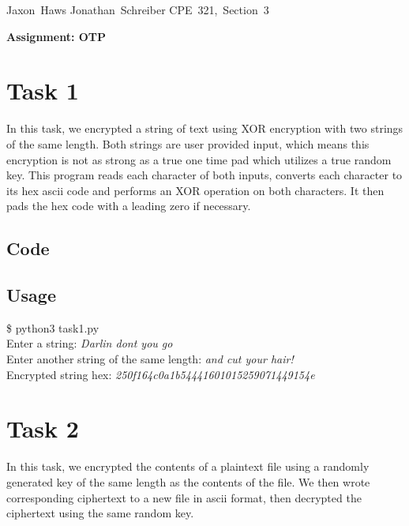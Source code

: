 \documentclass[11pt]{article}
\begin{document}
\hfill\vbox{\hbox{Jaxon Haws}
		\hbox{Jonathan Schreiber}	
		\hbox{CPE 321, Section 3}}\par

\bigskip
\centerline{\Large\bf Assignment: OTP}\par
\bigskip

\section{Task 1}

  In this task, we encrypted a string of text using XOR encryption with two 
  strings of the same length. Both strings are user provided input, which
  means this encryption is not as strong as a true one time pad which utilizes 
  a true random key. 
  This program reads each character of both inputs, converts each character 
  to its hex ascii code and performs an XOR operation on both characters. 
  It then pads the hex code with a leading zero if necessary. 

  \subsection{Code}
    

  \subsection{Usage}
   
    {\tt\begin{tabbing}                                                                                                                                                                     
       \$ python3 task1.py\\
       Enter a string: {\it Darlin dont you go}\\
       Enter another string of the same length: {\it and cut your hair!} \\
       Encrypted string hex: {\it 250f164c0a1b54441601015259071449154e}\\
      \end{tabbing}}

\section{Task 2}

In this task, we encrypted the contents of a plaintext file using a randomly 
generated key of the same length as the contents of the file. We then wrote
corresponding ciphertext to a new file in ascii format, then decrypted the 
ciphertext using the same random key. 
\end{document}
